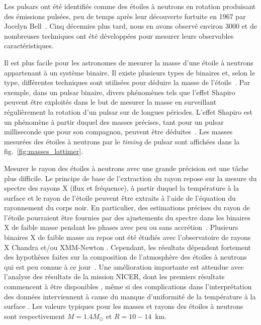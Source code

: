 Les pulsars ont été identifiés comme des étoiles à neutrons en rotation 
produisant des émissions pulsées, peu de temps après leur découverte fortuite 
en 1967 par Jocelyn Bell~\cite{Hewish1968}. Cinq décennies plus tard, nous en 
avons observé environ 3000 et de nombreuses techniques ont été développées pour 
mesurer leurs observables caractéristiques.

Il est plus facile pour les astronomes de mesurer la masse d'une étoile à 
neutrons appartenant à un système binaire. Il existe plusieurs types de 
binaires et, selon le type, différentes techniques sont utilisées 
pour déduire la masse de l'étoile~\cite{Haensel2007}.
Par exemple, dans un pulsar binaire, divers phénomènes tels que
l'effet Shapiro~\cite{Shapiro1964} peuvent être exploités dans le but de 
mesurer la masse en surveillant régulièrement la rotation d'un pulsar sur de 
longues périodes. L'effet Shapiro est un phénomène à
partir duquel des masses précises, tant pour un pulsar milliseconde que pour 
son compagnon, peuvent être déduites~\cite{Demorest2010,Cromartie2020}. 
Les masses mesurées des étoiles à neutrons par le \textit{timing} de pulsar 
sont affichées dans la fig.~\ref{fig:masses_lattimer}. 

Mesurer le rayon des étoiles à neutrons avec une grande précision est une tâche 
plus difficile. 
Le principe de base de l'extraction du rayon repose sur la mesure du 
spectre des rayons X (flux et fréquence), à partir duquel la température à la 
surface et le rayon de l'étoile peuvent être extraits à l'aide de l'équation 
du rayonnement du corps noir. 
En particulier, des estimations précises du rayon de l'étoile pourraient être 
fournies par des ajustements du spectre dans les binaires X de faible masse 
pendant les phases avec peu ou sans accrétion~\cite{Brown1998}.
%
Plusieurs binaires X de faible masse au repos ont été étudiés avec
l'observatoire de rayons X Chandra et/ou 
XMM-Newton \cite{Heinke2014,Servillat2012,Guillot2014,Guillot2013}.
%
Cependant, les résultats dépendent fortement des hypothèses faites sur la 
composition de l'atmosphère des étoiles à neutrons qui est peu 
connue à ce jour~\cite{Steiner2018}. 
Une amélioration importante est attendue avec l'analyse des résultats de la 
mission NICER, dont les premiers résultats commencent à être disponibles 
\cite{Bogdanov2019a,Bogdanov2019b,Miller2019,Raaijmakers2019,Riley2019}, 
même si des complications dans l'interprétation des données interviennent à
cause du manque d'uniformité de la température à la surface 
\cite{Bogdanov2019a,Bogdanov2019b,Miller2019,Raaijmakers2019,Riley2019}. 
Les valeurs typiques pour les masses et rayons des étoiles à 
neutrons sont respectivement $M = 1.4M_\odot$ et $R = 10-14$~km. 

